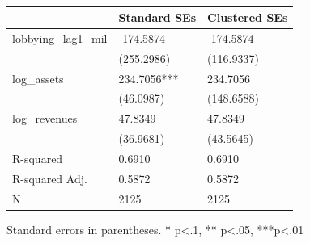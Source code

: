 \begin{table}
\caption{}
\label{}
\begin{center}
\begin{tabular}{lll}
\hline
                    & Standard SEs & Clustered SEs  \\
\hline
lobbying\_lag1\_mil & -174.5874    & -174.5874      \\
                    & (255.2986)   & (116.9337)     \\
log\_assets         & 234.7056***  & 234.7056       \\
                    & (46.0987)    & (148.6588)     \\
log\_revenues       & 47.8349      & 47.8349        \\
                    & (36.9681)    & (43.5645)      \\
R-squared           & 0.6910       & 0.6910         \\
R-squared Adj.      & 0.5872       & 0.5872         \\
N                   & 2125         & 2125           \\
\hline
\end{tabular}
\end{center}
\end{table}
\bigskip
Standard errors in parentheses. \newline 
* p<.1, ** p<.05, ***p<.01